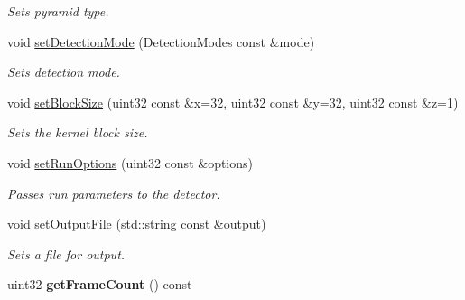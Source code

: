 \begin{DoxyCompactItemize}
\begin{DoxyCompactList}\small\item\em Sets pyramid type. \end{DoxyCompactList}\item 
\hypertarget{classwb_1_1_waldboost_detector_a684b792e9d7ba36867ac1af96114fec2}{}void \hyperlink{classwb_1_1_waldboost_detector_a684b792e9d7ba36867ac1af96114fec2}{set\+Detection\+Mode} (Detection\+Modes const \&mode)\label{classwb_1_1_waldboost_detector_a684b792e9d7ba36867ac1af96114fec2}

\begin{DoxyCompactList}\small\item\em Sets detection mode. \end{DoxyCompactList}\item 
\hypertarget{classwb_1_1_waldboost_detector_a613ce8204eb00ab500545cd1771f63d7}{}void \hyperlink{classwb_1_1_waldboost_detector_a613ce8204eb00ab500545cd1771f63d7}{set\+Block\+Size} (uint32 const \&x=32, uint32 const \&y=32, uint32 const \&z=1)\label{classwb_1_1_waldboost_detector_a613ce8204eb00ab500545cd1771f63d7}

\begin{DoxyCompactList}\small\item\em Sets the kernel block size. \end{DoxyCompactList}\item 
\hypertarget{classwb_1_1_waldboost_detector_abccec68ecd5ddf0e87573f6416adbdc6}{}void \hyperlink{classwb_1_1_waldboost_detector_abccec68ecd5ddf0e87573f6416adbdc6}{set\+Run\+Options} (uint32 const \&options)\label{classwb_1_1_waldboost_detector_abccec68ecd5ddf0e87573f6416adbdc6}

\begin{DoxyCompactList}\small\item\em Passes run parameters to the detector. \end{DoxyCompactList}\item 
\hypertarget{classwb_1_1_waldboost_detector_ad009ff31d6d57fe04f04d3c5641a6c55}{}void \hyperlink{classwb_1_1_waldboost_detector_ad009ff31d6d57fe04f04d3c5641a6c55}{set\+Output\+File} (std\+::string const \&output)\label{classwb_1_1_waldboost_detector_ad009ff31d6d57fe04f04d3c5641a6c55}

\begin{DoxyCompactList}\small\item\em Sets a file for output. \end{DoxyCompactList}\item 
\hypertarget{classwb_1_1_waldboost_detector_a603225ad95a13d8d7cce3d8e51438926}{}uint32 {\bfseries get\+Frame\+Count} () const \label{classwb_1_1_waldboost_detector_a603225ad95a13d8d7cce3d8e51438926}

\end{DoxyCompactItemize}



